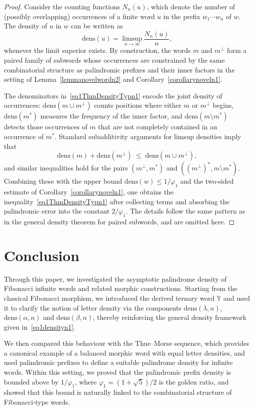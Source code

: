 \documentclass[12pt]{amsart}
\begin{document}
\begin{proof}
Consider the counting functions $N_n(u)$, which denote the number of (possibly overlapping) occurrences of a finite word $u$ in the prefix $w_1\cdots w_n$ of $w$. The density of $u$ in $w$ can be written as
\[
\mathrm{dens}(u) = \limsup_{n\to\infty} \frac{N_n(u)}{n},
\]
whenever the limit superior exists. By construction, the words $m$ and $m^{\perp}$ form a paired family of subwords whose occurrences are constrained by the same combinatorial structure as palindromic prefixes and their inner factors in the setting of Lemma~\ref{lemmanovelwordn2} and Corollary~\ref{corollarynoveln1}.

The denominators in~\eqref{eq1ThmDensityTypn1} encode the joint density of occurrences:
$\mathrm{dens}(m\cup m^{\perp})$ counts positions where either $m$ or $m^{\perp}$ begins, $\mathrm{dens}(m^{*})$ measures the frequency of the inner factor, and $\mathrm{dens}(m\setminus m^{*})$ detects those occurrences of $m$ that are not completely contained in an occurrence of $m^{*}$. Standard subadditivity arguments for limsup densities imply that
\[
\mathrm{dens}(m) + \mathrm{dens}(m^{\perp})
\;\le\;
\mathrm{dens}(m\cup m^{\perp}),
\]
and similar inequalities hold for the pairs $(m^{\perp},m^{*})$ and $((m^{\perp})^{*},m\setminus m^{*})$. Combining these with the upper bound $\mathrm{dens}(w)\le 1/\varphi_1$ and the two-sided estimate of Corollary~\ref{corollarynoveln1}, one obtains the inequality~\eqref{eq1ThmDensityTypn1} after collecting terms and absorbing the palindromic error into the constant $2/\varphi_1$. The details follow the same pattern as in the general density theorem for paired subwords, and are omitted here.
\end{proof}
\section{Conclusion}\label{sec5}
Through this paper, we investigated the asymptotic palindrome density of Fibonacci infinite words and related morphic constructions. Starting from the classical Fibonacci morphism, we introduced the derived ternary word $\mathbb{Y}$ and used it to clarify the notion of letter density via the components $\mathrm{dens}(\lambda,n)$, $\mathrm{dens}(\alpha,n)$ and $\mathrm{dens}(\beta,n)$, thereby reinforcing the general density framework given in~\eqref{eq1densityn1}.

We then compared this behaviour with the Thue--Morse sequence, which provides a canonical example of a balanced morphic word with equal letter densities, and used palindromic prefixes to define a suitable palindrome density for infinite words. Within this setting, we proved that the palindromic prefix density is bounded above by $1/\varphi_1$, where $\varphi_1=(1+\sqrt{5})/2$ is the golden ratio, and showed that this bound is naturally linked to the combinatorial structure of Fibonacci-type words.
\end{document}
